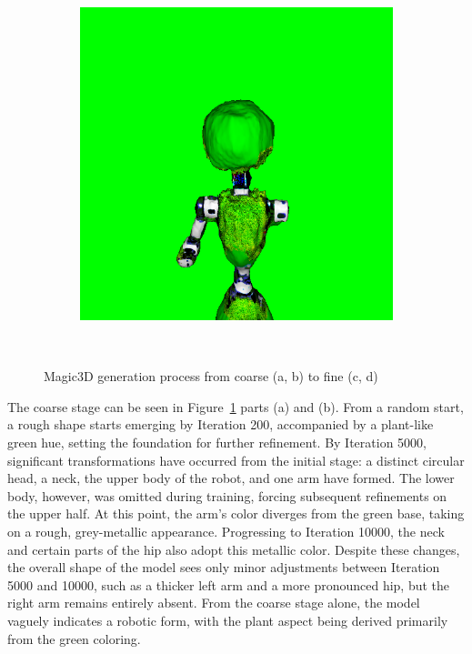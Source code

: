 \begin{figure}[H]
\begin{subfigure}[b]{0.2\textwidth}
        \includegraphics[width=\textwidth]{etc/a robot made out of plants/magic3d/magic3D_refine_robot_10000_part1.png}
        \caption{}
    \end{subfigure}
    \caption{Magic3D generation process from coarse (a, b) to fine (c, d)}~\label{fig:generationMagic3D}
\end{figure} 

The coarse stage can be seen in Figure~\ref{fig:generationMagic3D} parts (a) and (b). From a random start, a rough shape starts emerging by Iteration 200, accompanied by a plant-like green hue, setting the foundation for further refinement. By Iteration 5000, significant transformations have occurred from the initial stage: a distinct circular head, a neck, the upper body of the robot, and one arm have formed. The lower body, however, was omitted during training, forcing subsequent refinements on the upper half. At this point, the arm's color diverges from the green base, taking on a rough, grey-metallic appearance. Progressing to Iteration 10000, the neck and certain parts of the hip also adopt this metallic color. Despite these changes, the overall shape of the model sees only minor adjustments between Iteration 5000 and 10000, such as a thicker left arm and a more pronounced hip, but the right arm remains entirely absent. From the coarse stage alone, the model vaguely indicates a robotic form, with the plant aspect being derived primarily from the green coloring.

